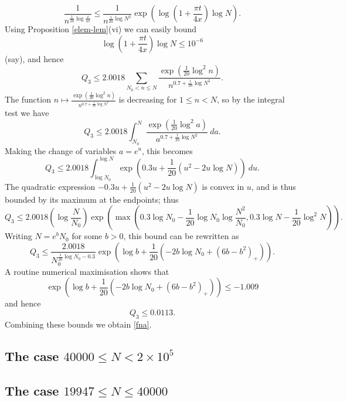 $$ \frac{1}{n^{\frac{1}{20} \log \frac{x}{4\pi}}} \leq \frac{1}{n^{\frac{1}{20} \log N^2}} \exp(\log(1 + \frac{\pi t}{4x}) \log N).$$
Using Proposition \ref{elem-lem}(vi) we can easily bound
$$ \log(1 + \frac{\pi t}{4x}) \log N \leq 10^{-6}$$
(say), and hence
$$ Q_3 \leq 2.0018 \sum_{N_0 < n \leq N} \frac{\exp( \frac{1}{20} \log^2 n)}{n^{0.7 + \frac{1}{20} \log N^2}}.$$
The function $n \mapsto \frac{\exp( \frac{1}{20} \log^2 n)}{n^{0.7 + \frac{1}{20} \log N^2}}$ is decreasing for $1 \leq n < N$, so by the integral test we have
$$ Q_3 \leq 2.0018 \int_{N_0}^N \frac{\exp( \frac{1}{20} \log^2 a)}{a^{0.7 + \frac{1}{20} \log N^2}}\ da.$$
Making the change of variables $a = e^u$, this becomes
$$ Q_3 \leq 2.0018 \int_{\log N_0}^{\log N} \exp( 0.3 u + \frac{1}{20} (u^2 - 2u \log N) )\ du.$$
The quadratic expression $- 0.3 u + \frac{1}{20} (u^2 - 2u \log N)$ is convex in $u$, and is thus bounded by its maximum at the endpoints; thus
$$ Q_3 \leq 2.0018 (\log \frac{N}{N_0}) \exp( \max( 0.3 \log N_0 -\frac{1}{20} \log N_0 \log \frac{N^2}{N_0}, 0.3 \log N - \frac{1}{20} \log^2 N ) ).$$
Writing $N = e^b N_0$ for some $b>0$, this bound can be rewritten as 
$$ Q_3 \leq \frac{2.0018}{N_0^{\frac{1}{20} \log N_0 - 0.3}} \exp( \log b + \frac{1}{20} ( -2b \log N_0 + (6b-b^2)_+ ) ).$$
A routine numerical maximisation shows that
$$ \exp( \log b + \frac{1}{20} ( -2b \log N_0 + (6b-b^2)_+ ) ) \leq -1.009$$
and hence
$$ Q_3 \leq 0.0113.$$
Combining these bounds we obtain \eqref{fna}.





\subsection{The case $40000 \leq N < 2 \times 10^5$}




\subsection{The case $19947 \leq N \leq 40000$}
